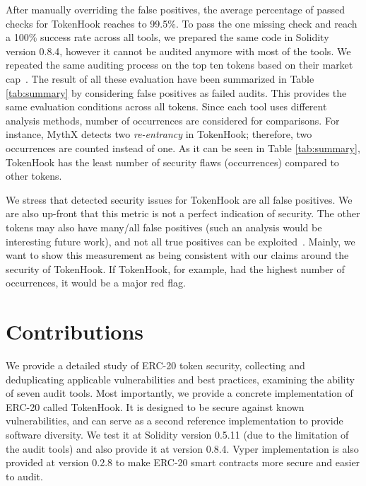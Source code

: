 
After manually overriding the false positives, the average percentage of passed checks for TokenHook reaches to 99.5\%. To pass the one missing check and reach a 100\% success rate across all tools, we prepared the same code in Solidity version 0.8.4, however it cannot be audited anymore with most of the tools. We repeated the same auditing process on the top ten tokens based on their market cap~\cite{TokenTracker}. The result of all these evaluation have been summarized in Table \ref{tab:summary} by considering false positives as failed audits. This provides the same evaluation conditions across all tokens. Since each tool uses different analysis methods, number of occurrences are considered for comparisons. For instance, MythX detects two \textit{re-entrancy} in TokenHook; therefore, two occurrences are counted instead of one. As it can be seen in Table \ref{tab:summary}, TokenHook has the least number of security flaws (occurrences) compared to other tokens.

We stress that detected security issues for TokenHook are all false positives. We are also up-front that this metric is not a perfect indication of security. The other tokens may also have many/all false positives (such an analysis would be interesting future work), and not all true positives can be exploited~\cite{VulExp}. Mainly, we want to show this measurement as being consistent with our claims around the security of TokenHook. If TokenHook, for example, had the highest number of occurrences, it would be a major red flag.

\section{Contributions}
We provide a detailed study of ERC-20 token security, collecting and deduplicating applicable vulnerabilities and best practices, examining the ability of seven audit tools. Most importantly, we provide a concrete implementation of ERC-20 called TokenHook. It is designed to be secure against known vulnerabilities, and can serve as a second reference implementation to provide software diversity. We test it at Solidity version 0.5.11 (due to the limitation of the audit tools) and also provide it at version 0.8.4. Vyper implementation is also provided at version 0.2.8 to make ERC-20 smart contracts more secure and easier to audit.

